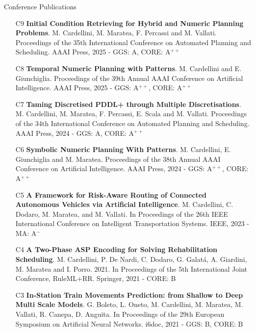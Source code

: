 \documentclass{resume} %
\begin{document}
\begin{rSection}{Conference Publications}
\begin{enumerate}[leftmargin=5mm]
	\item[C9] \textbf{Initial Condition Retrieving for Hybrid and Numeric Planning Problems}. M. Cardellini, M. Maratea, F. Percassi and M. Vallati. Proceedings of the 35th International Conference on Automated Planning and Scheduling. AAAI Press, 2025 - GGS: A, CORE: A$^{++}$
	
	
	\item[C8] \textbf{Temporal Numeric Planning with Patterns}. M. Cardellini and E. Giunchiglia. Proceedings of the 39th Annual AAAI Conference on Artificial Intelligence. AAAI Press, 2025 - GGS: A$^{++}$, CORE: A$^{++}$
	
	\item[C7] \textbf{Taming Discretised PDDL+ through Multiple Discretisations}. M. Cardellini, M. Maratea, F. Percassi, E. Scala and M. Vallati. Proceedings of the 34th International Conference on Automated Planning and Scheduling. AAAI Press, 2024 - GGS: A, CORE: A$^{++}$
	
	\item[C6] \textbf{Symbolic Numeric Planning With Patterns}. M. Cardellini, E. Giunchiglia and M. Maratea. Proceedings of the 38th Annual AAAI Conference on Artificial Intelligence. AAAI Press, 2024 - GGS: A$^{++}$, CORE: A$^{++}$
	
	\item[C5] \textbf{A Framework for Risk-Aware Routing of Connected Autonomous Vehicles via Artificial Intelligence}. M. Cardellini, C. Dodaro, M. Maratea, and M. Vallati. In Proceedings of the 26th IEEE International Conference on Intelligent Transportation Systems. IEEE, 2023 - MA: A$^-$
	
	\item[C4] \textbf{A Two-Phase ASP Encoding for Solving Rehabilitation Scheduling}. M. Cardellini, P. De Nardi, C. Dodaro, G. Galat\'a, A. Giardini, M. Maratea and I. Porro. 2021. In Proceedings of the 5th International Joint Conference, RuleML+RR. Springer, 2021 - CORE: B
	
	
	\item[C3] \textbf{In-Station Train Movements Prediction: from Shallow to Deep Multi Scale Models}. G. Boleto, L. Oneto, M. Cardellini, M. Maratea, M. Vallati, R. Canepa, D. Anguita. In Proceedings of the 29th European Symposium on Artificial Neural Networks. i6doc, 2021 - GGS: B, CORE: B
	
	
	

\end{enumerate}
\end{rSection}
\end{document}
